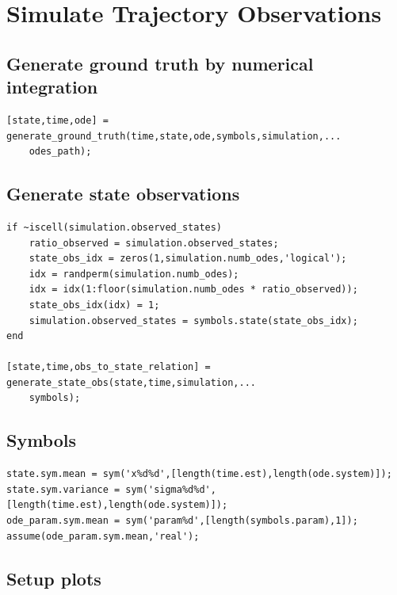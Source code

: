 \section{Simulate Trajectory Observations}

\begin{par}
\subsection{ Generate ground truth by numerical integration }
\end{par} \vspace{1em}
\color{RoyalPurple}\begin{verbatim}
[state,time,ode] = generate_ground_truth(time,state,ode,symbols,simulation,...
    odes_path);
\end{verbatim}
\color{black}
\begin{par}
\subsection{ Generate state observations }
\end{par} \vspace{1em}
\color{RoyalPurple}\begin{verbatim}
if ~iscell(simulation.observed_states)
    ratio_observed = simulation.observed_states;
    state_obs_idx = zeros(1,simulation.numb_odes,'logical');
    idx = randperm(simulation.numb_odes);
    idx = idx(1:floor(simulation.numb_odes * ratio_observed));
    state_obs_idx(idx) = 1;
    simulation.observed_states = symbols.state(state_obs_idx);
end

[state,time,obs_to_state_relation] = generate_state_obs(state,time,simulation,...
    symbols);
\end{verbatim}
\color{black}
\begin{par}
\subsection{ Symbols }
\end{par} \vspace{1em}
\color{RoyalPurple}\begin{verbatim}
state.sym.mean = sym('x%d%d',[length(time.est),length(ode.system)]);
state.sym.variance = sym('sigma%d%d',[length(time.est),length(ode.system)]);
ode_param.sym.mean = sym('param%d',[length(symbols.param),1]);
assume(ode_param.sym.mean,'real');
\end{verbatim}
\color{black}
\begin{par}
\subsection{ Setup plots }
\end{par} \vspace{1em}
